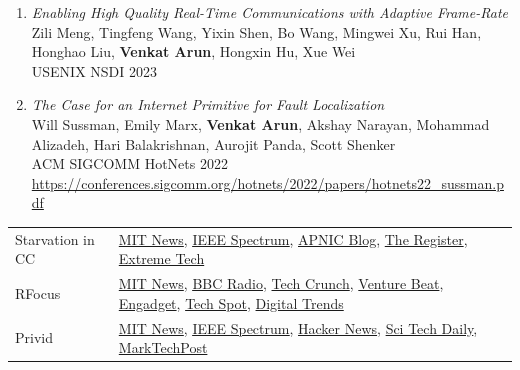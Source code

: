 \documentclass[notitlepage]{article}
\newcommand{\heading}[1]{\vspace{1em}{\large \MakeUppercase{\textrm{#1}}}

  \hrulefill
}
\begin{document}
\begin{enumerate}
\item {\it Enabling High Quality Real-Time Communications with Adaptive Frame-Rate}\\
  Zili Meng, Tingfeng Wang, Yixin Shen, Bo Wang, Mingwei Xu, Rui Han, Honghao Liu, {\bf Venkat Arun}, Hongxin Hu, Xue Wei\\
  USENIX NSDI 2023\\
\item {\it The Case for an Internet Primitive for Fault Localization}\\
  Will Sussman, Emily Marx, {\bf Venkat Arun}, Akshay Narayan, Mohammad Alizadeh, Hari Balakrishnan, Aurojit Panda, Scott Shenker\\
  ACM SIGCOMM HotNets 2022\\
  \url{https://conferences.sigcomm.org/hotnets/2022/papers/hotnets22_sussman.pdf}
\end{enumerate}
\fi

\heading{Selected Press Coverage}

\begin{tabular}{l l}
  Starvation in CC & %
  \href{https://news.mit.edu/2022/algorithm-computer-network-bandwidth-0804}{MIT News},
  \underline{\href{https://spectrum.ieee.org/internet-congestion-control}{IEEE Spectrum}},
  \underline{\href{https://blog.apnic.net/2022/11/23/congestion-control-algorithms-are-not-fair/}{APNIC Blog}},
  \href{https://www.theregister.com/2022/08/22/network_congestion_algorithms/?td=keepreading}{The Register},
  \href{https://www.extremetech.com/internet/338610-mit-researchers-say-all-network-congestion-algorithms-are-unfair}{Extreme Tech}\\
  RFocus & %
  \href{https://news.mit.edu/2020/smart-surface-smart-devices-mit-csail-0203}{MIT News},
  \underline{\href{https://www.bbc.co.uk/programmes/p08271xg}{BBC Radio}},
  \href{https://techcrunch.com/2020/02/03/mits-rfocus-technology-could-turn-your-walls-into-antennas/}{Tech Crunch},
  \href{https://venturebeat.com/mobile/mit-csails-rfocus-boosts-wireless-signal-strength-by-a-factor-of-nearly-10/}{Venture Beat},
  \href{https://www.engadget.com/2020-02-03-mit-rfocus-smart-surface.html}{Engadget},
  \href{https://www.techspot.com/news/83869-mit-rfocus-smart-surface-uses-tiny-antennas-amplify.html}{Tech Spot},
  \href{https://www.digitaltrends.com/news/rfocus-smart-wallpaper-boosts-signal-strength/}{Digital Trends}\\
  Privid & %
  \href{https://news.mit.edu/2022/privid-security-tool-guarantees-privacy-surveillance-footage-0328}{MIT News},
  \underline{\href{https://spectrum.ieee.org/surveillance-privacy}{IEEE Spectrum}},
  \href{https://thehackernews.com/2022/03/privid-privacy-preserving-surveillance.html}{Hacker News},
  \href{https://scitechdaily.com/security-tool-privid-guarantees-privacy-in-surveillance-footage/}{Sci Tech Daily},
  \href{https://www.marktechpost.com/2022/03/30/researchers-from-mit-csail-introduce-privid-an-ai-tool-build-on-differential-privacy-to-guarantee-privacy-in-video-footage-from-surveillance-cameras/}{MarkTechPost}

\end{tabular}
\end{document}
